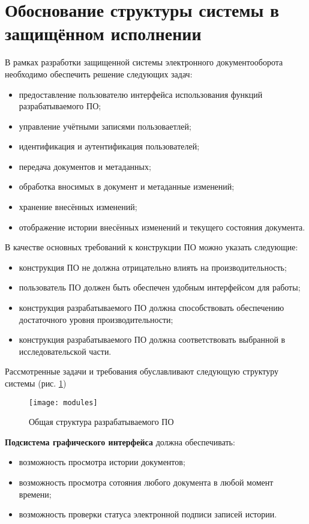 \section{Обоснование структуры системы в защищённом исполнении} \label{model}

В рамках разработки защищенной системы электронного документооборота необходимо обеспечить решение следующих задач:
\begin{itemize}
	\item предоставление пользователю интерфейса использования функций разрабатываемого ПО;
	\item управление учётными записями пользоваетлей;
	\item идентификация и аутентификация пользователей;
	\item передача документов и метаданных;
	\item обработка вносимых в документ и метаданные изменений;
	\item хранение внесённых изменений;
	\item отображение истории внесённых изменений и текущего состояния документа.
\end{itemize}

\vspace{\baselineskip}
В качестве основных требований к конструкции ПО можно указать следующие:
\begin{itemize}
	\item конструкция ПО не должна отрицательно влиять на производительность;
	\item пользователь ПО должен быть обеспечен удобным интерфейсом для работы;
	\item конструкция разрабатываемого ПО должна способствовать обеспечению достаточного уровня производительности;
	\item конструкция разрабатываемого ПО должна соответствовать выбранной в исследовательской части.
\end{itemize}

\vspace{\baselineskip}
Рассмотренные задачи и требования обуславливают следующую структуру системы (рис. \ref{img:modules})
\begin{figure}[h!]
  \centering
  \texttt{[image: modules]}
  \caption{Общая структура разрабатываемого ПО}
  \label{img:modules}
\end{figure}

\vspace{\baselineskip}
\textbf{Подсистема графического интерфейса} должна обеспечивать:
\begin{itemize}
	\item возможность просмотра истории документов;
	\item возможность просмотра сотояния любого документа в любой момент времени;
	\item возможность проверки статуса электронной подписи записей истории.
\end{itemize}

